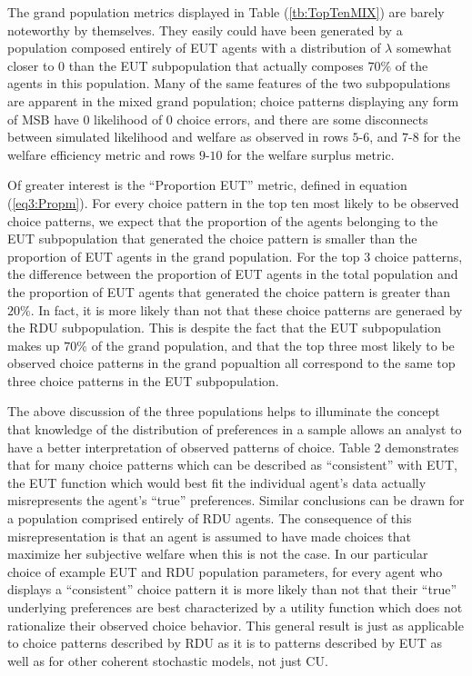 \documentclass[../main.tex]{subfiles}
\begin{document}
The grand population metrics displayed in Table (\ref{tb:TopTenMIX}) are barely noteworthy by themselves.
They easily could have been generated by a population composed entirely of EUT agents with a distribution of $\lambda$ somewhat closer to $0$ than the EUT subpopulation that actually composes $70\%$ of the agents in this population.
Many of the same features of the two subpopulations are apparent in the mixed grand population;
choice patterns displaying any form of MSB have $0$ likelihood of $0$ choice errors, and there are some disconnects between simulated likelihood and welfare as observed in rows $5$-$6$, and $7$-$8$ for the welfare efficiency metric and rows $9$-$10$ for the welfare surplus metric.

Of greater interest is the \enquote{Proportion EUT} metric, defined in equation (\ref{eq3:Propm}).
For every choice pattern in the top ten most likely to be observed choice patterns, we expect that the proportion of the agents belonging to the EUT subpopulation that generated the choice pattern is smaller than the proportion of EUT agents in the grand population.
For the top 3 choice patterns, the difference between the proportion of EUT agents in the total population and the proportion of EUT agents that generated the choice pattern is greater than $20\%$.
In fact, it is more likely than not that these choice patterns are generaed by the RDU subpopulation.
This is despite the fact that the EUT subpopulation makes up $70\%$ of the grand population, and that the top three most likely to be observed choice patterns in the grand popualtion all correspond to the same top three choice patterns in the EUT subpopulation.

The above discussion of the three populations helps to illuminate the concept that knowledge of the distribution of preferences in a sample allows an analyst to have a better interpretation of observed patterns of choice.
Table 2 demonstrates that for many choice patterns which can be described as \enquote{consistent} with EUT, the EUT function which would best fit the individual agent's data actually misrepresents the agent's \enquote{true} preferences.
Similar conclusions can be drawn for a population comprised entirely of RDU agents.
The consequence of this misrepresentation is that an agent is assumed to have made choices that maximize her subjective welfare when this is not the case.
In our particular choice of example EUT and RDU population parameters, for every agent who displays a \enquote{consistent} choice pattern it is more likely than not that their \enquote{true} underlying preferences are best characterized by a utility function which does not rationalize their observed choice behavior.
This general result is just as applicable to choice patterns described by RDU as it is to patterns described by EUT as well as for other coherent stochastic models, not just CU.
\end{document}
